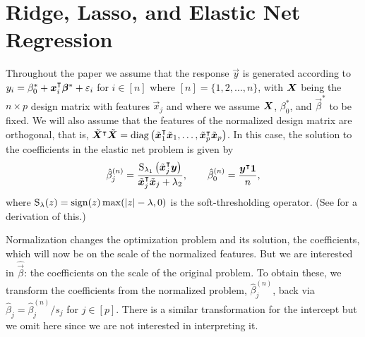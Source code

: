 \section{Ridge, Lasso, and Elastic Net Regression}%
\label{sec:theory}

Throughout the paper we assume that the response \(\vec{y}\) is generated according to
\(y_i = \beta_0^* + \boldsymbol x_i^\intercal \boldsymbol\beta^* + \varepsilon_i\) for \(i \in [n]\) where \([n]
= \{1,2,\dots,n\}\), with \(\boldsymbol X\) being the \(n \times p\) design matrix with features
\(\vec x_j\) and where we assume \(\boldsymbol{X}\), \(\beta_0^*\), and \(\vec{\beta}^*\) to be
fixed. We will also assume that the features of the normalized design matrix are
orthogonal, that is, \(\tilde{\boldsymbol{X}}^\intercal \tilde{\boldsymbol{X}} =
\operatorname{diag}\left(\tilde{\boldsymbol{x}}_1^\intercal \tilde{\boldsymbol{x}}_1, \dots, \tilde{\boldsymbol{x}}_p^\intercal
\tilde{\boldsymbol{x}}_p\right)\). In this case, the solution to the coefficients in the elastic
net problem is given by
%
\begin{equation}
  \label{eq:orthogonal-solution-normalized}
  \hat{\beta}^{(n)}_j = \frac{\operatorname{S}_{\lambda_1}\left(\tilde{\boldsymbol{x}}_j^\intercal \boldsymbol{y}\right)}{\tilde{\boldsymbol{x}}_j^\intercal \tilde{\boldsymbol{x}}_j + \lambda_2},
  \qquad
  \hat{\beta}_0^{(n)} = \frac{\boldsymbol{y}^\intercal \boldsymbol{1}}{n},
\end{equation}
%
where \(\operatorname{S}_\lambda(z) = \operatorname{sign}(z) \max(|z| - \lambda, 0)\) is the soft-thresholding
operator. (See  for a derivation of this.)

Normalization changes the optimization problem and its solution, the coefficients, which
will now be on the scale of the normalized features. But we are interested in
\(\hat{\vec{\beta}}\): the coefficients on the scale of the original problem. To obtain
these, we transform the coefficients from the normalized problem, \(\hat\beta^{(n)}_j\),
back via \(\hat\beta_j = \hat\beta^{(n)}_j/s_j\) for \(j \in [p]\). There is a similar
transformation for the intercept but we omit here since we are not interested in
interpreting it.

